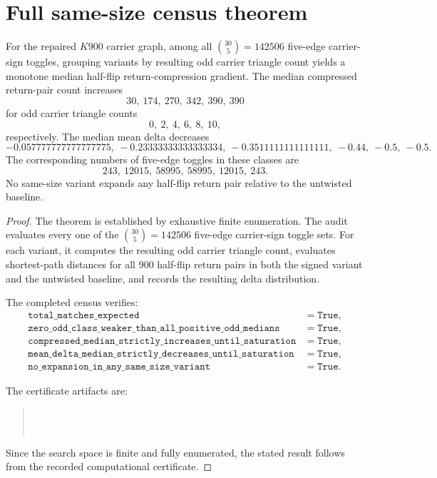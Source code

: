 \section{Full same-size census theorem}

\begin{theorem}
For the repaired \(K900\) carrier graph, among all \(\binom{30}{5}=142506\) five-edge carrier-sign toggles, grouping variants by resulting odd carrier triangle count yields a monotone median half-flip return-compression gradient. The median compressed return-pair count increases
\[
    30,\ 174,\ 270,\ 342,\ 390,\ 390
\]
for odd carrier triangle counts
\[
    0,\ 2,\ 4,\ 6,\ 8,\ 10,
\]
respectively. The median mean delta decreases
\[
    -0.057777777777777775,\ 
    -0.23333333333333334,\ 
    -0.3511111111111111,\ 
    -0.44,\ 
    -0.5,\ 
    -0.5.
\]
The corresponding numbers of five-edge toggles in these classes are
\[
    243,\ 12015,\ 58995,\ 58995,\ 12015,\ 243.
\]
No same-size variant expands any half-flip return pair relative to the untwisted baseline.
\end{theorem}

\begin{proof}
The theorem is established by exhaustive finite enumeration. The audit evaluates every one of the \(\binom{30}{5}=142506\) five-edge carrier-sign toggle sets. For each variant, it computes the resulting odd carrier triangle count, evaluates shortest-path distances for all 900 half-flip return pairs in both the signed variant and the untwisted baseline, and records the resulting delta distribution.

The completed census verifies:
\[
\begin{array}{ll}
\texttt{total\_matches\_expected} & = \texttt{True},\\
\texttt{zero\_odd\_class\_weaker\_than\_all\_positive\_odd\_medians} & = \texttt{True},\\
\texttt{compressed\_median\_strictly\_increases\_until\_saturation} & = \texttt{True},\\
\texttt{mean\_delta\_median\_strictly\_decreases\_until\_saturation} & = \texttt{True},\\
\texttt{no\_expansion\_in\_any\_same\_size\_variant} & = \texttt{True}.
\end{array}
\]

The certificate artifacts are:

\begin{quote}
\\
\\
\end{quote}

Since the search space is finite and fully enumerated, the stated result follows from the recorded computational certificate.
\end{proof}

